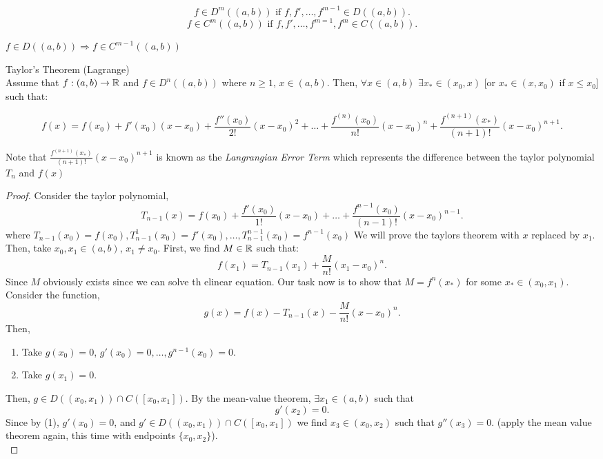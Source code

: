 \documentclass[a4paper]{article}
\begin{document}
\begin{definition}
  \[
  f \in D^{m}((a,b)) \text{ if $f, f', \ldots, f^{m-1} \in D((a,b))$}
  .\] 
  \[
  f \in C^{m} ((a,b)) \text{ if $f, f', \ldots, f^{m=1}, f^{m} \in C((a,b))$} 
  .\] 
\end{definition}

\begin{note}
  $f \in D((a,b)) \Rightarrow f \in C^{m-1} ((a,b))$
\end{note}

\begin{theorem}{Taylor's Theorem (Lagrange)}\\
  Assume that $f:(a,b) \to \mathbb{R}$ and $f \in D^{n} ((a,b))$ where $n \geq 1$,  $x \in (a,b)$. Then,  $\forall x \in (a,b)$ $\exists x_{*} \in (x_0,x)$ [or $x_{*} \in (x, x_0)$ if $x \leq x_0$] such that:


\[
f(x) = f(x_0) + f'(x_0)(x - x_0) + \frac{f''(x_0)}{2!}(x - x_0)^2 + \dots + \frac{f^{(n)}(x_0)}{n!}(x - x_0)^n + \frac{f^{(n+1)}(x_{*})}{(n+1)!}(x - x_0)^{n+1}.
\]
 
Note that $\frac{f^{(n+1)}(x_{*})}{(n+1)!}(x - x_0)^{n+1}$ is known as the \textit{Langrangian Error Term} which represents the difference between the taylor polynomial $T_n$ and  $f(x)$

  
  \noindent\hrulefill

  \begin{proof}
   Consider the taylor polynomial,  
   \[
   T_{n-1}(x) = f(x_0) + \frac{f'(x_0)}{1!} (x-x_0) + \ldots + \frac{f^{n-1}( x_0)}{(n-1)!} (x-x_0)^{n-1}
   .\] 
   where $T_{n-1}(x_0) = f(x_0), T^{1}_{n-1} (x_0)= f'(x_0), \ldots, T^{n-1}_{n-1} (x_0) = f^{n-1} (x_0)$
    We will prove the taylors theorem with  $x$ replaced by  $x_1$. Then, take $x_0,x_1 \in (a,b)$, $x_1 \neq x_0$. First, we find $M \in \mathbb{R}$ such that:
    \[
    f(x_1) = T_{n-1} (x_1) + \frac{M}{n!} (x_1 - x_0)^{n}
    .\]
    Since $M$ obviously exists since we can solve th elinear equation. Our task now is to show that  $M = f^{n}(x_{*}) $ for some $x_{*} \in (x_0,x_1)$. Consider the function,
    \[
    g(x) = f(x) - T_{n-1} (x) - \frac{M}{n!} (x-x_0)^{n}
    .\] 
    Then,
    \begin{enumerate}
      \item Take $g(x_0) = 0$, $g'(x_0) = 0, \ldots ,g^{n-1} (x_0) = 0$.
      \item Take $g(x_1) = 0$.
    \end{enumerate}
    Then, $g \in D((x_0,x_1)) \cap C([x_0,x_1])$. By the mean-value theorem, $\exists  x_1 \in (a,b)$ such that 
    \[
    g'(x_2) = 0
    .\] 
    Since by (1),  $g'(x_{0}) = 0$, and $g' \in D((x_0,x_1)) \cap C([x_0, x_1])$ we find $x_3 \in (x_0,x_2)$ such that $g''(x_3) = 0$. (apply the mean value theorem again, this time with endpoints $\{x_0,x_2\} $). \\


\end{proof}
\end{theorem}
\end{document}
